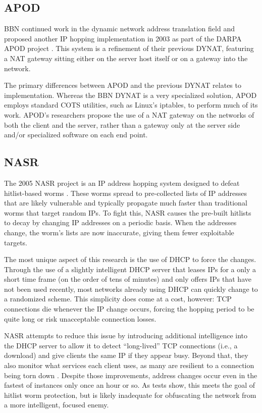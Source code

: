 \subsection{\acf{APOD}}
\par BBN continued work in the dynamic network address translation field and proposed another \ac{IP} hopping implementation in 2003 as part of the \ac{DARPA} \acf{APOD} project \cite{APOD}. This system is a refinement of their previous \ac{DYNAT}, featuring a \ac{NAT} gateway sitting either on the server host itself or on a gateway into the network.

\par The primary differences between APOD and the previous DYNAT relates to implementation. Whereas the BBN DYNAT is a very specialized solution, \ac{APOD} employs standard \ac{COTS} utilities, such as Linux's iptables, to perform much of its work. \ac{APOD}'s researchers propose the use of a \ac{NAT} gateway on the networks of both the client and the server, rather than a gateway only at the server side and/or specialized software on each end point.

\subsection{\acf{NASR}}
\par The 2005 \acf{NASR} project is an \ac{IP} address hopping system designed to defeat hitlist-based worms \cite{NASR}. These worms spread to pre-collected lists of \ac{IP} addresses that are likely vulnerable and typically propagate much faster than traditional worms that target random \acp{IP}. To fight this, \ac{NASR} causes the pre-built hitlists to decay by changing IP addresses on a periodic basis. When the addresses change, the worm's lists are now inaccurate, giving them fewer exploitable targets.

\par The most unique aspect of this research is the use of \ac{DHCP} to force the changes. Through the use of a slightly intelligent \ac{DHCP} server that leases \acp{IP} for a only a short time frame (on the order of tens of minutes) and only offers \acp{IP} that have not been used recently, most networks already using DHCP can quickly change to a randomized scheme. This simplicity does come at a cost, however: \ac{TCP} connections die whenever the IP change occurs, forcing the hopping period to be quite long or risk unacceptable connection losses.

\par \ac{NASR} attempts to reduce this issue by introducing additional intelligence into the DHCP server to allow it to detect ``long-lived'' TCP connections (i.e., a download) and give clients the same IP if they appear busy. Beyond that, they also monitor what services each client uses, as many are resilient to a connection being torn down \cite{NASR}. Despite those improvements, address changes occur even in the fastest of instances only once an hour or so. As tests show, this meets the goal of hitlist worm protection, but is likely inadequate for obfuscating the network from a more intelligent, focused enemy.


